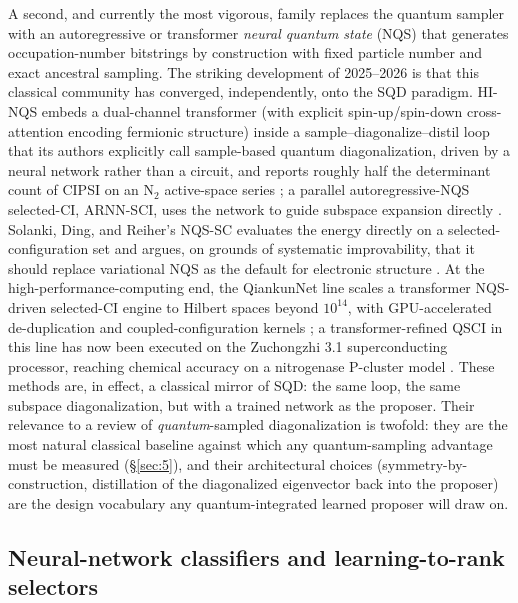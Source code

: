\documentclass[11pt]{article}
\begin{document}
A second, and currently the most vigorous, family replaces the quantum sampler with an autoregressive or transformer \emph{neural quantum state} (NQS) \cite{carleo2017} that generates occupation-number bitstrings by construction with fixed particle number and exact ancestral sampling. The striking development of 2025--2026 is that this classical community has converged, independently, onto the SQD paradigm. HI-NQS embeds a dual-channel transformer (with explicit spin-up/spin-down cross-attention encoding fermionic structure) inside a sample--diagonalize--distil loop that its authors explicitly call sample-based quantum diagonalization, driven by a neural network rather than a circuit, and reports roughly half the determinant count of CIPSI on an N$_2$ active-space series \cite{chang2026}; a parallel autoregressive-NQS selected-CI, ARNN-SCI, uses the network to guide subspace expansion directly \cite{thompson2026}. Solanki, Ding, and Reiher's NQS-SC evaluates the energy directly on a selected-configuration set and argues, on grounds of systematic improvability, that it should replace variational NQS as the default for electronic structure \cite{solanki2026}. At the high-performance-computing end, the QiankunNet line scales a transformer NQS-driven selected-CI engine to Hilbert spaces beyond $10^{14}$, with GPU-accelerated de-duplication and coupled-configuration kernels \cite{shang2025,sun2026}; a transformer-refined QSCI in this line has now been executed on the Zuchongzhi 3.1 superconducting processor, reaching chemical accuracy on a nitrogenase P-cluster model \cite{zeng2026}. These methods are, in effect, a classical mirror of SQD: the same loop, the same subspace diagonalization, but with a trained network as the proposer. Their relevance to a review of \emph{quantum}-sampled diagonalization is twofold: they are the most natural classical baseline against which any quantum-sampling advantage must be measured (\S\ref{sec:5}), and their architectural choices (symmetry-by-construction, distillation of the diagonalized eigenvector back into the proposer) are the design vocabulary any quantum-integrated learned proposer will draw on.


\subsection{Neural-network classifiers and learning-to-rank selectors}\label{sec:4-4}
\end{document}
